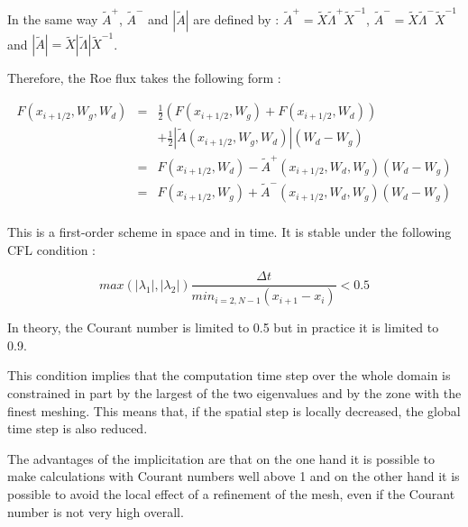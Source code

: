 In the same way $\tilde{A}^+$, $\tilde{A}^-$ and $|\tilde A|$ are defined by : $\tilde{A}^+ = \tilde X \tilde{\Lambda}^+ \tilde{X}^{-1}$, $\tilde{A}^- = \tilde X \tilde{\Lambda}^- \tilde{X}^{-1}$ and $|\tilde A| = \tilde X |\tilde \Lambda| \tilde{X}^{-1}$.

\vspace{0.5cm}

Therefore, the Roe flux takes the following form :

\begin{eqnarray}
 F(x_{i+1/2},W_g,W_d) & = & \frac{1}{2} \left ( F(x_{i+1/2},W_g) + F(x_{i+1/2},W_d) \right ) \nonumber \\
                      &   & + \frac{1}{2} \left | \tilde{A}(x_{i+1/2},W_g,W_d) \right | (W_d -W_g) \nonumber \\
 & = & F(x_{i+1/2},W_d) - \tilde{A}^+ (x_{i+1/2},W_d,W_g) (W_d - W_g) \nonumber \\
 & = & F(x_{i+1/2},W_g) + \tilde{A}^- (x_{i+1/2},W_d,W_g) (W_d - W_g) \nonumber \\
 & & 
\end{eqnarray}

\vspace{0.5cm}

This is a first-order scheme in space and in time. It is stable under the following CFL condition :

\begin{equation}
 max(|\lambda_1|,|\lambda_2|) \frac{\Delta t}{min_{i=2,N-1} (x_{i+1}-x_i)} < 0.5
\end{equation}

\vspace{0.5cm}

In theory, the Courant number is limited to 0.5 but in practice it is limited to 0.9.

\vspace{0.5cm}

This condition implies that the computation time step over the whole domain is constrained in part by the largest of the two eigenvalues and by the zone with the finest meshing. This means that, if the spatial step is locally decreased, the global time step is also reduced.

\vspace{0.5cm}

The advantages of the implicitation are that on the one hand it is possible to make calculations with Courant numbers well above 1 and on the other hand it is possible to avoid the local effect of a refinement of the mesh, even if the Courant number is not very high overall.

